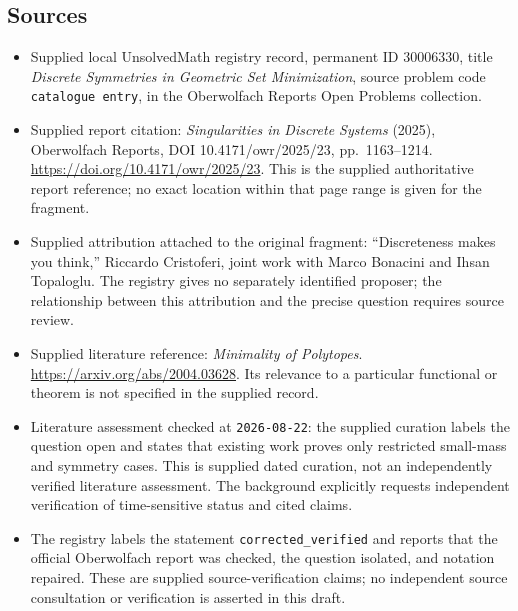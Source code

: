 \documentclass[11pt]{article}
\begin{document}
\subsection{Sources}
\begin{itemize}
\item Supplied local UnsolvedMath registry record, permanent ID \(30006330\), title \emph{Discrete Symmetries in Geometric Set Minimization}, source problem code \texttt{catalogue entry}, in the Oberwolfach Reports Open Problems collection.
\item Supplied report citation: \emph{Singularities in Discrete Systems} (2025), Oberwolfach Reports, DOI 10.4171/owr/2025/23, pp.~1163--1214. \url{https://doi.org/10.4171/owr/2025/23}. This is the supplied authoritative report reference; no exact location within that page range is given for the fragment.
\item Supplied attribution attached to the original fragment: ``Discreteness makes you think,'' Riccardo Cristoferi, joint work with Marco Bonacini and Ihsan Topaloglu. The registry gives no separately identified proposer; the relationship between this attribution and the precise question requires source review.
\item Supplied literature reference: \emph{Minimality of Polytopes}. \url{https://arxiv.org/abs/2004.03628}. Its relevance to a particular functional or theorem is not specified in the supplied record.
\item Literature assessment checked at \texttt{2026-08-22}: the supplied curation labels the question open and states that existing work proves only restricted small-mass and symmetry cases. This is supplied dated curation, not an independently verified literature assessment. The background explicitly requests independent verification of time-sensitive status and cited claims.
\item The registry labels the statement \texttt{corrected\_verified} and reports that the official Oberwolfach report was checked, the question isolated, and notation repaired. These are supplied source-verification claims; no independent source consultation or verification is asserted in this draft.
\end{itemize}
\end{document}
